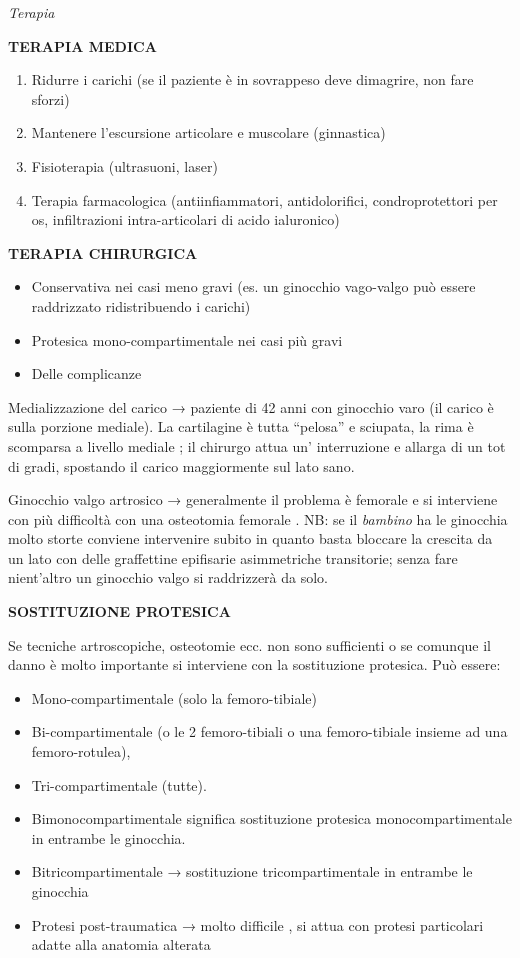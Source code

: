 \documentclass[]{article}
\begin{document}
\emph{Terapia }

\textbf{TERAPIA MEDICA }

\begin{enumerate}
\def\labelenumi{\arabic{enumi}.}
\item
  Ridurre i carichi (se il paziente è in sovrappeso deve dimagrire, non
  fare sforzi)
\item
  Mantenere l'escursione articolare e muscolare (ginnastica)
\item
  Fisioterapia (ultrasuoni, laser)
\item
  Terapia farmacologica (antiinfiammatori, antidolorifici,
  condroprotettori per os, infiltrazioni intra-articolari di acido
  ialuronico)
\end{enumerate}

\textbf{TERAPIA CHIRURGICA }

\begin{itemize}
\item
  Conservativa nei casi meno gravi (es. un ginocchio vago-valgo può
  essere raddrizzato ridistribuendo i carichi)
\item
  Protesica mono-compartimentale nei casi più gravi
\item
  Delle complicanze
\end{itemize}

Medializzazione del carico → paziente di 42 anni con ginocchio varo (il
carico è sulla porzione mediale). La cartilagine è tutta ``pelosa'' e
sciupata, la rima è scomparsa a livello mediale ; il chirurgo attua un'
interruzione e allarga di un tot di gradi, spostando il carico
maggiormente sul lato sano.

Ginocchio valgo artrosico → generalmente il problema è femorale e si
interviene con più difficoltà con una osteotomia femorale . NB: se il
\emph{bambino} ha le ginocchia molto storte conviene intervenire subito
in quanto basta bloccare la crescita da un lato con delle graffettine
epifisarie asimmetriche transitorie; senza fare nient'altro un ginocchio
valgo si raddrizzerà da solo.

\textbf{SOSTITUZIONE PROTESICA }

Se tecniche artroscopiche, osteotomie ecc. non sono sufficienti o se
comunque il danno è molto importante si interviene con la sostituzione
protesica. Può essere:

\begin{itemize}
\item
  Mono-compartimentale (solo la femoro-tibiale)
\item
  Bi-compartimentale (o le 2 femoro-tibiali o una femoro-tibiale insieme
  ad una femoro-rotulea),
\item
  Tri-compartimentale (tutte).
\item
  Bimonocompartimentale significa sostituzione protesica
  monocompartimentale in entrambe le ginocchia.
\item
  Bitricompartimentale → sostituzione tricompartimentale in entrambe le
  ginocchia
\item
  Protesi post-traumatica → molto difficile , si attua con protesi
  particolari adatte alla anatomia alterata
\end{itemize}
\end{document}

